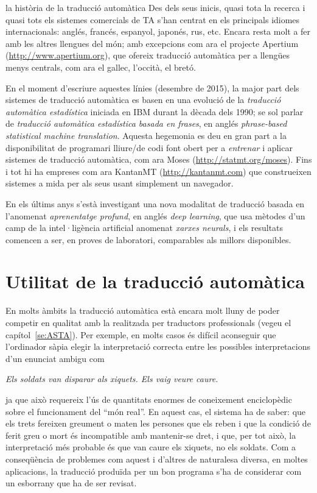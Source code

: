 \begin{persabermes}{la història de la traducció automàtica}
Des dels seus inicis, quasi tota la recerca i quasi tots els sistemes
comercials de TA s'han centrat en els principals idiomes
internacionals: anglés, francés, espanyol, japonés, rus, etc.  Encara
resta molt a fer amb les altres llengues del món; amb excepcions com
ara el projecte Apertium (\url{http://www.apertium.org}), que ofereix
traducció automàtica per a llengües menys centrals, com ara el gallec,
l'occità, el bretó.

En el moment d'escriure aquestes línies (desembre de 2015), la major
part dels sistemes de traducció automàtica es basen en una evolució de
la \emph{traducció automàtica estadística} iniciada en IBM durant la
dècada dels 1990; se sol parlar de \emph{traducció automàtica
  estadística basada en frases}, en anglés \emph{phrase-based
  statistical machine translation}. Aquesta hegemonia es deu en gran
part a la disponibilitat de programari lliure/de codi font obert per a
\emph{entrenar} i aplicar sistemes de traducció automàtica, com ara
Moses (\url{http://statmt.org/moses}). Fins i tot hi ha empreses com
ara KantanMT (\url{http://kantanmt.com}) que construeixen sistemes a
mida per als seus usant simplement un navegador.

En els últims anys s'està investigant una nova modalitat de traducció
basada en l'anomenat \emph{aprenentatge profund}, en anglés \emph{deep
  learning}, que usa mètodes d'un camp de la intel·ligència artificial
anomenat \emph{xarxes neurals}, i els resultats comencen a ser, en
proves de laboratori, comparables als millors disponibles.

\mbox{}


\end{persabermes}


\section{Utilitat de la traducció automàtica}
\label{ss:UTA}
En molts àmbits la traducció automàtica està encara molt
lluny de poder competir en qualitat amb la realitzada per traductors
professionals (vegeu el capítol~\ref{se:ASTA}). 
Per exemple, en molts casos és difícil aconseguir que l'ordinador
sàpia elegir la interpretació correcta  entre les possibles
interpretacions 
d'un enunciat ambigu com 
\begin{center}
\emph{Els soldats van disparar als xiquets. Els vaig veure caure.}
\end{center} 
ja que això requereix l'ús de quantitats enormes de coneixement
enciclopèdic sobre el funcionament del ``món real''. En aquest cas, el
sistema ha de saber: que els trets fereixen greument o maten les
persones que els reben i que la condició de ferit greu o mort és
incompatible amb mantenir-se dret, i que, per tot això, la
interpretació més probable és que van caure els xiquets, no els
soldats. Com a conseqüència de problemes com aquest i d'altres de
naturalesa diversa, en moltes aplicacions, la traducció produïda per
un bon programa s'ha de considerar com un esborrany que ha de ser
revisat.


